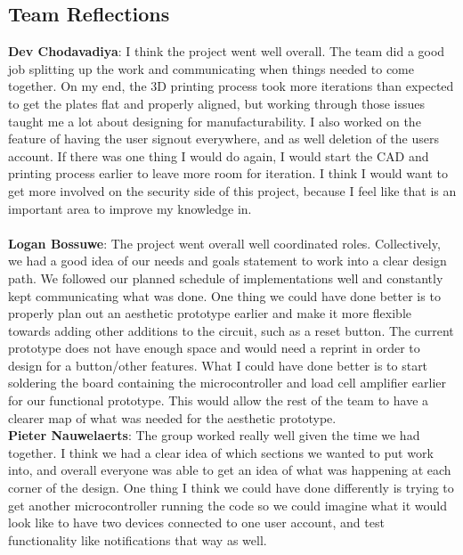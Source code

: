 \subsection{Team Reflections}


\noindent\textbf{Dev Chodavadiya}:
I think the project went well overall. The team did a good job splitting up the work and communicating when things needed to come together. On my end, the 3D printing process took more iterations than expected to get the plates flat and properly aligned, but working through those issues taught me a lot about designing for manufacturability. I also worked on the feature of having the user signout everywhere, and as well deletion of the users account. If there was one thing I would do again, I would start the CAD and printing process earlier to leave more room for iteration. I think I would want to get more involved on the security side of this project, because I feel like that is an important area to improve my knowledge in.\\
\\

\noindent\textbf{Logan Bossuwe}:
The project went overall well coordinated roles. Collectively, we had a good idea of our needs and goals statement to work into a clear design path. We followed our planned schedule of implementations well and constantly kept communicating what was done. One thing we could have done better is to properly plan out an aesthetic prototype earlier and make it more flexible towards adding other additions to the circuit, such as a reset button. The current prototype does not have enough space and would need a reprint in order to design for a button/other features. What I could have done better is to start soldering the board containing the microcontroller and load cell amplifier earlier for our functional prototype. This would allow the rest of the team to have a clearer map of what was needed for the aesthetic prototype.
\\

\noindent\textbf{Pieter Nauwelaerts}:
The group worked really well given the time we had together. I think we had a clear idea of which sections we wanted to put work into, and overall everyone was able to get an idea of what was happening at each corner of the design. One thing I think we could have done differently is trying to get another microcontroller running the code so we could imagine what it would look like to have two devices connected to one user account, and test functionality like notifications that way as well. 
\\

